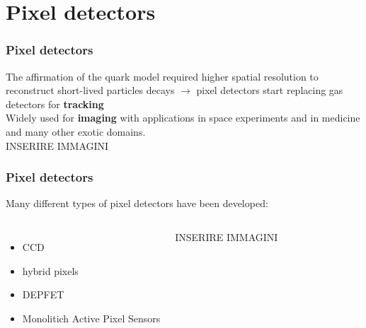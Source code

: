 \section{Pixel detectors}

    \begin{frame}
        \frametitle{Pixel detectors}
        The affirmation of the quark model required higher spatial resolution to reconstruct short-lived particles decays $\rightarrow$ pixel detectors start replacing gas detectors for \textbf{tracking} \\
        \medskip
        Widely used for \textbf{imaging} with applications in space experiments and in medicine and many other exotic domains.\\
        \bigskip
        INSERIRE IMMAGINI
    \end{frame}

    \begin{frame}
        \frametitle{Pixel detectors}
        Many different types of pixel detectors have been developed: 
        \begin{columns}
                \begin{itemize}
                    \item CCD 
                    \item hybrid pixels
                    \item DEPFET
                    \item Monolitich Active Pixel Sensors
                \end{itemize}
            INSERIRE IMMAGINI

            
        \end{columns}


    \end{frame}



